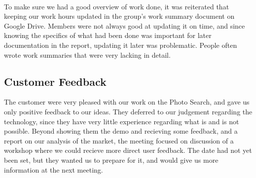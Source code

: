 \paragraph{} To make sure we had a good overview of work done, it was reiterated that keeping our work hours updated in the group's work summary document on Google Drive. Members were not always good at updating it on time, and since knowing the specifics of what had been done was important for later documentation in the report, updating it later was problematic. People often wrote work summaries that were very lacking in detail.

\subsection{Customer Feedback}
\label{subsec:S1RetrospectiveCustomerFeedback}
The customer were very pleased with our work on the Photo Search, and gave us only positive feedback to our ideas. They deferred to our judgement regarding the technology, since they have very little experience regarding what is and is not possible. Beyond showing them the demo and recieving some feedback, and a report on our analysis of the market, the meeting focused on discussion of a workshop where we could recieve more direct user feedback. The date had not yet been set, but they wanted us to prepare for it, and would give us more information at the next meeting.